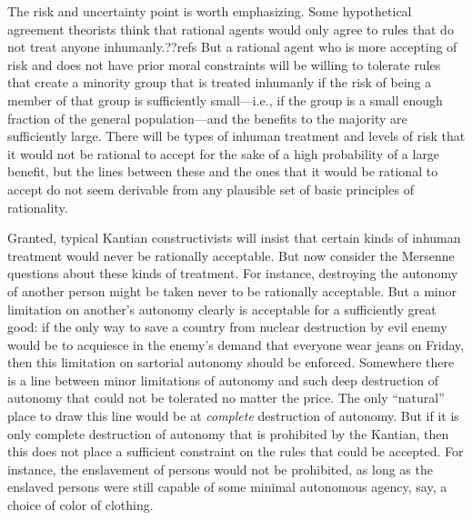 The risk and uncertainty point is worth emphasizing. Some hypothetical agreement theorists think that 
rational agents would only agree to rules that do not treat anyone inhumanly.??refs But a rational agent who is more accepting of
risk and does not have prior moral constraints will be willing to tolerate rules that create a minority group that is treated inhumanly if the risk of being a member of 
that group is sufficiently small---i.e., if the group is a small enough fraction of the general population---and the benefits 
to the majority are sufficiently large. There will be types of inhuman treatment and levels of risk that it would not be 
rational to accept for the sake of a high probability of a large benefit, but the lines between these and the ones that it would 
be rational to accept do not seem derivable from any plausible set of basic principles of rationality. 

Granted, typical Kantian constructivists will insist that certain kinds of inhuman treatment would never be rationally acceptable. But 
now consider the Mersenne questions about these kinds of treatment. For instance, destroying the autonomy of another person might
be taken never to be rationally acceptable. But a minor limitation on another's autonomy clearly is acceptable for a sufficiently
great good: if the only way to save a country from nuclear destruction by evil enemy would be to acquiesce in the enemy's demand 
that everyone wear jeans on Friday, then this limitation on sartorial autonomy should be enforced. Somewhere there is a line between
minor limitations of autonomy and such deep destruction of autonomy that could not be tolerated no matter the price. The only
``natural'' place to draw this line would be at \textit{complete} destruction of autonomy. But if it is only complete destruction
of autonomy that is prohibited by the Kantian, then this does not place a sufficient constraint on the rules that could
be accepted. For instance, the enslavement of persons would not be prohibited, as long as the enslaved persons were still capable of some minimal autonomous agency, say, a choice of color of clothing.

